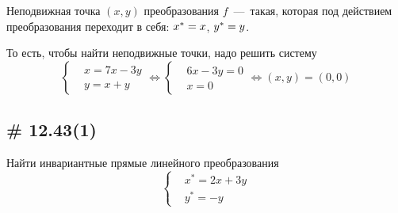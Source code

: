 \documentclass[a4paper,12pt]{article}
\begin{document}
  \begin{solution}
    \begin{definition}
      Неподвижная точка $(x, y)$ преобразования $f$~---~такая, которая под действием преобразования переходит в себя: $x^* \hm= x$, $y^* \hm= y$.
    \end{definition}
    
    То есть, чтобы найти неподвижные точки, надо решить систему
    \[
      \left\{
        \begin{aligned}
          &x = 7x - 3y\\
          &y = x + y
        \end{aligned}
      \right.
      \Leftrightarrow
      \left\{
        \begin{aligned}
          &6x - 3y = 0\\
          &x = 0
        \end{aligned}
      \right.
      \Leftrightarrow
      (x, y) = (0, 0)
    \]
  \end{solution}
  
  
  \subsection{\# 12.43(1)}
  
  Найти инвариантные прямые линейного преобразования
  \[
    \left\{
      \begin{aligned}
        &x^* = 2x + 3y\\
        &y^* = -y
      \end{aligned}
    \right.
  \]
  
\end{document}
